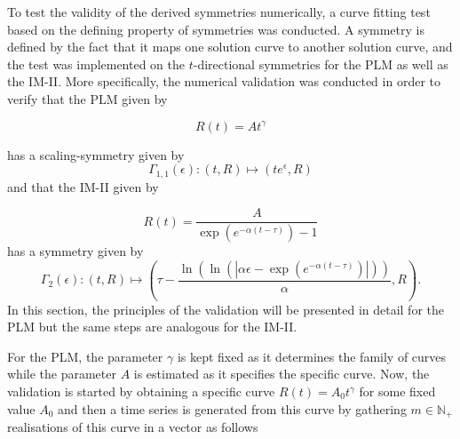 To test the validity of the derived symmetries numerically, a curve fitting test based on the defining property of symmetries was conducted. A symmetry is defined by the fact that it maps one solution curve to another solution curve, and the test was implemented on the $t$-directional symmetries for the PLM as well as the IM-II. More specifically, the numerical validation was conducted in order to verify that the PLM given by

$$R(t)=At^{\gamma}$$

has a scaling-symmetry given by
\begin{equation}
\Gamma_{1,1}(\epsilon):(t,R)\mapsto \left(te^{\epsilon},R\right)
\label{eq:scaling}
\end{equation}
and that the IM-II given by

$$R(t)=\dfrac{A}{\exp\left(e^{-\alpha(t-\tau)}\right)-1}$$
has a symmetry given by
$$\Gamma_2(\epsilon):(t,R)\mapsto\left(\tau-\dfrac{\ln\left(\ln\left(\left|\alpha\epsilon-\exp\left(e^{-\alpha (t-\tau)}\right)\right|\right)\right)}{\alpha},R\right).$$
In this section, the principles of the validation will be presented in detail for the PLM but the same steps are analogous for the IM-II.

For the PLM, the parameter $\gamma$ is kept fixed as it determines the family of curves while the parameter $A$ is estimated as it specifies the specific curve. Now, the validation is started by obtaining a specific curve $R(t)=A_0t^{\gamma}$ for some fixed value $A_0$ and then a time series is generated from this curve by gathering $m\in\mathbb{N}_+$ realisations of this curve in a vector as follows


